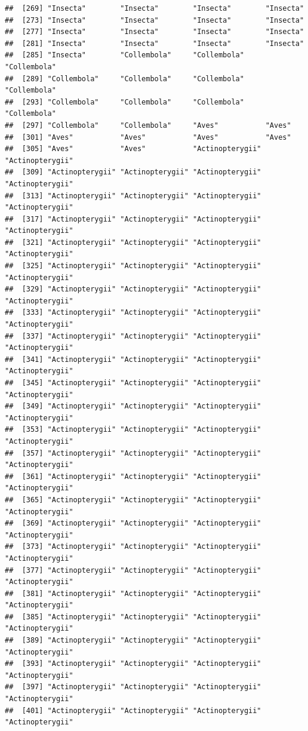 \documentclass[
]{article}
\begin{document}
\begin{verbatim}
##  [269] "Insecta"        "Insecta"        "Insecta"        "Insecta"       
##  [273] "Insecta"        "Insecta"        "Insecta"        "Insecta"       
##  [277] "Insecta"        "Insecta"        "Insecta"        "Insecta"       
##  [281] "Insecta"        "Insecta"        "Insecta"        "Insecta"       
##  [285] "Insecta"        "Collembola"     "Collembola"     "Collembola"    
##  [289] "Collembola"     "Collembola"     "Collembola"     "Collembola"    
##  [293] "Collembola"     "Collembola"     "Collembola"     "Collembola"    
##  [297] "Collembola"     "Collembola"     "Aves"           "Aves"          
##  [301] "Aves"           "Aves"           "Aves"           "Aves"          
##  [305] "Aves"           "Aves"           "Actinopterygii" "Actinopterygii"
##  [309] "Actinopterygii" "Actinopterygii" "Actinopterygii" "Actinopterygii"
##  [313] "Actinopterygii" "Actinopterygii" "Actinopterygii" "Actinopterygii"
##  [317] "Actinopterygii" "Actinopterygii" "Actinopterygii" "Actinopterygii"
##  [321] "Actinopterygii" "Actinopterygii" "Actinopterygii" "Actinopterygii"
##  [325] "Actinopterygii" "Actinopterygii" "Actinopterygii" "Actinopterygii"
##  [329] "Actinopterygii" "Actinopterygii" "Actinopterygii" "Actinopterygii"
##  [333] "Actinopterygii" "Actinopterygii" "Actinopterygii" "Actinopterygii"
##  [337] "Actinopterygii" "Actinopterygii" "Actinopterygii" "Actinopterygii"
##  [341] "Actinopterygii" "Actinopterygii" "Actinopterygii" "Actinopterygii"
##  [345] "Actinopterygii" "Actinopterygii" "Actinopterygii" "Actinopterygii"
##  [349] "Actinopterygii" "Actinopterygii" "Actinopterygii" "Actinopterygii"
##  [353] "Actinopterygii" "Actinopterygii" "Actinopterygii" "Actinopterygii"
##  [357] "Actinopterygii" "Actinopterygii" "Actinopterygii" "Actinopterygii"
##  [361] "Actinopterygii" "Actinopterygii" "Actinopterygii" "Actinopterygii"
##  [365] "Actinopterygii" "Actinopterygii" "Actinopterygii" "Actinopterygii"
##  [369] "Actinopterygii" "Actinopterygii" "Actinopterygii" "Actinopterygii"
##  [373] "Actinopterygii" "Actinopterygii" "Actinopterygii" "Actinopterygii"
##  [377] "Actinopterygii" "Actinopterygii" "Actinopterygii" "Actinopterygii"
##  [381] "Actinopterygii" "Actinopterygii" "Actinopterygii" "Actinopterygii"
##  [385] "Actinopterygii" "Actinopterygii" "Actinopterygii" "Actinopterygii"
##  [389] "Actinopterygii" "Actinopterygii" "Actinopterygii" "Actinopterygii"
##  [393] "Actinopterygii" "Actinopterygii" "Actinopterygii" "Actinopterygii"
##  [397] "Actinopterygii" "Actinopterygii" "Actinopterygii" "Actinopterygii"
##  [401] "Actinopterygii" "Actinopterygii" "Actinopterygii" "Actinopterygii"

\end{verbatim}
\end{document}

